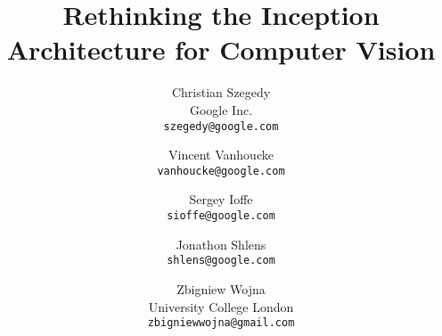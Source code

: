 \documentclass[10pt,twocolumn,letterpaper]{article}
\begin{document}
\title{Rethinking the Inception Architecture for Computer Vision}

\author{Christian Szegedy\\
Google Inc.\\
{\tt\small szegedy@google.com}
\and
Vincent Vanhoucke\\
{\tt\small vanhoucke@google.com}
\and
Sergey Ioffe\\
{\tt\small sioffe@google.com}
\and
Jonathon Shlens\\
{\tt\small shlens@google.com}
\and
Zbigniew Wojna\\
University College London\\
{\tt\small zbigniewwojna@gmail.com}
}


\maketitle

\begin{abstract}

\end{abstract}













{\small


}
\end{document}
